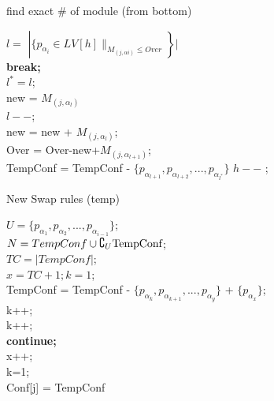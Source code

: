 \documentclass{article}
\begin{document}
\begin{algorithm}
  \LinesNumbered
  \caption{find exact \# of module (from bottom)}
        {$l = $
        $\left| \{ p_{\alpha_i} \in LV[h] \|_{M_{(j,\alpha i)} \leq Over}\right\}|$\\
            {\textup{\textbf{break;}}\\}
            {$l^*=l$;\\new = $M_{(j,\alpha_l)}$\\
                {$l--$;\\
                new = new + $M_{(j,\alpha_l)}$;\\
                }
                Over = Over-new+$M_{(j,\alpha_{l+1})}$;\\
            TempConf = TempConf - $\{p_{\alpha_{l+1}}, p_{\alpha_{l+2}},..., p_{\alpha_{l^*}}\}$}
        \Else
            {$h--$ ;\\}
    }
\end{algorithm}

\begin{algorithm}
  \LinesNumbered
  \caption{New Swap rules (temp)}
  $U = \{p_{\alpha_1}, p_{\alpha_2},..., p_{\alpha_{i-1}}\}$;\\
  $N = TempConf \cup \complement_U\textup{TempConf}$;\\
  $TC = \left|TempConf\right|$;\\
  $x = TC+1; k = 1$;\\
    {
        {
            {TempConf = TempConf - $\{p_\alpha_{k}, p_\alpha_{k+1},..., p_\alpha_{y}\}$ + $\{p_\alpha_x\}$;\\
            k++;\\}
                {k++;\\
                \textup{\textbf{continue;}}\\}
                {x++;\\
                k=1;\\}}
    }
    Conf[j] = TempConf
\end{algorithm}
\end{document}
